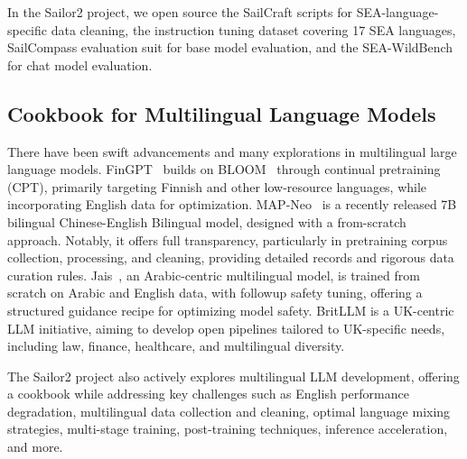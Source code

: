 In the Sailor2 project, we open source the SailCraft scripts for SEA-language-specific data cleaning, the instruction tuning dataset covering 17 SEA languages, SailCompass evaluation suit for base model evaluation, and the SEA-WildBench for chat model evaluation.


\subsection{Cookbook for Multilingual Language Models}
There have been swift advancements and many explorations in multilingual large language models.
FinGPT~\citep{luukkonen-etal-2023-fingpt} builds on BLOOM~\citep{Scao2022BLOOMA1} through continual pretraining (CPT), primarily targeting Finnish and other low-resource languages, while incorporating English data for optimization.
MAP-Neo~\citep{zhang2024map} is a recently released 7B bilingual Chinese-English Bilingual model, designed with a from-scratch approach. Notably, it offers full transparency, particularly in pretraining corpus collection, processing, and cleaning, providing detailed records and rigorous data curation rules.
Jais~\citep{sengupta2023jais}, an Arabic-centric multilingual model, is trained from scratch on Arabic and English data, with followup safety tuning, offering a structured guidance recipe for optimizing model safety.
BritLLM \citep{britllm} is a UK-centric LLM initiative, aiming to develop open pipelines tailored to UK-specific needs, including law, finance, healthcare, and multilingual diversity.

The Sailor2 project also actively explores multilingual LLM development, offering a cookbook while addressing key challenges such as English performance degradation, multilingual data collection and cleaning, optimal language mixing strategies, multi-stage training, post-training techniques, inference acceleration, and more.